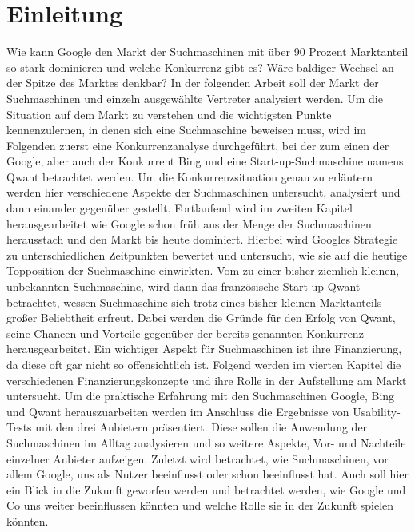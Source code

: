 \section{Einleitung}\label{sec:einleitung}
Wie kann Google den Markt der Suchmaschinen mit über 90 Prozent Marktanteil so stark dominieren und welche Konkurrenz gibt es?
Wäre baldiger Wechsel an der Spitze des Marktes denkbar?
In der folgenden Arbeit soll der Markt der Suchmaschinen und einzeln ausgewählte Vertreter analysiert werden.
Um die Situation auf dem Markt zu verstehen und die wichtigsten Punkte kennenzulernen, in denen sich eine Suchmaschine beweisen muss,
wird im Folgenden zuerst eine Konkurrenzanalyse durchgeführt, bei der zum einen der  Google,
aber auch der Konkurrent Bing und eine Start-up-Suchmaschine namens Qwant betrachtet werden.
Um die Konkurrenzsituation genau zu erläutern werden hier verschiedene Aspekte der Suchmaschinen untersucht, analysiert und dann einander gegenüber gestellt.
Fortlaufend wird im zweiten Kapitel herausgearbeitet wie Google schon früh aus der Menge der Suchmaschinen herausstach und den Markt bis heute dominiert.
Hierbei wird Googles Strategie zu unterschiedlichen Zeitpunkten bewertet und untersucht, wie sie auf die heutige Topposition der Suchmaschine einwirkten.
Vom  zu einer bisher ziemlich kleinen, unbekannten Suchmaschine,
wird dann das französische Start-up Qwant betrachtet, wessen Suchmaschine sich trotz eines bisher kleinen Marktanteils großer Beliebtheit erfreut.
Dabei werden die Gründe für den Erfolg von Qwant, seine Chancen und Vorteile gegenüber der bereits genannten Konkurrenz herausgearbeitet.
Ein wichtiger Aspekt für Suchmaschinen ist ihre Finanzierung, da diese oft gar nicht so offensichtlich ist.
Folgend werden im vierten Kapitel die verschiedenen Finanzierungskonzepte und ihre Rolle in der Aufstellung am Markt untersucht.
Um die praktische Erfahrung mit den Suchmaschinen Google, Bing und Qwant herauszuarbeiten werden im Anschluss die Ergebnisse von Usability-Tests mit den drei Anbietern präsentiert.
Diese sollen die Anwendung der Suchmaschinen im Alltag analysieren und so weitere Aspekte, Vor- und Nachteile einzelner Anbieter aufzeigen.
Zuletzt wird betrachtet, wie Suchmaschinen, vor allem Google, uns als Nutzer beeinflusst oder schon beeinflusst hat.
Auch soll hier ein Blick in die Zukunft geworfen werden und betrachtet werden, wie Google und Co uns weiter beeinflussen könnten und welche Rolle sie in der Zukunft spielen könnten.